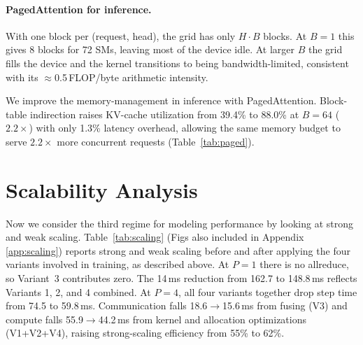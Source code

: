 \documentclass[11pt,letterpaper]{article}
\begin{document}
\paragraph{PagedAttention for inference.}
 With one block per (request, head), the grid has only $H{\cdot}B$ blocks. At $B{=}1$ this gives 8 blocks for 72 SMs, leaving most of the device idle. At larger $B$ the grid fills the device and the kernel transitions to being bandwidth-limited, consistent with its $\approx$0.5\,FLOP/byte arithmetic intensity.

We improve the memory-management in inference with PagedAttention. Block-table indirection raises KV-cache utilization from 39.4\% to 88.0\%
at $B{=}64$ ($2.2\times$) with only 1.3\% latency overhead, allowing the
same memory budget to serve $2.2\times$ more concurrent requests
(Table~\ref{tab:paged}).








\section{Scalability Analysis}\label{sec:scalability}


Now we consider the third regime for modeling performance by looking at strong and weak scaling. Table~\ref{tab:scaling} (Figs also included in Appendix \ref{app:scaling}) reports strong and weak scaling before and after
applying the four variants involved in training, as described above. At $P{=}1$ there is no allreduce, so Variant~3
contributes zero. The 14\,ms reduction from 162.7 to 148.8\,ms reflects
Variants 1, 2, and 4 combined. At $P{=}4$, all four variants together drop step time
from 74.5 to 59.8\,ms. Communication falls 18.6$\to$15.6\,ms from fusing
(V3) and compute falls 55.9$\to$44.2\,ms from kernel and allocation
optimizations (V1+V2+V4), raising strong-scaling efficiency from 55\% to
62\%.
\end{document}
